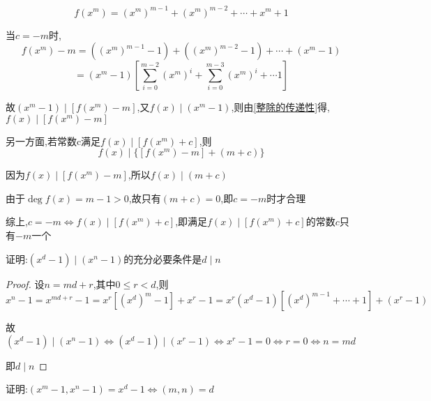 \begin{solution}
    \begin{equation*}
        f(x^m)=(x^m)^{m-1}+(x^m)^{m-2}+\cdots + x^m+1
    \end{equation*}

    当$c=-m$时,
    \begin{equation*}
        f(x^m)-m=((x^m)^{m-1}-1)+((x^m)^{m-2}-1)+\cdots + (x^m-1)
    \end{equation*}
    \begin{equation*}
        =(x^m-1)[\overset{m-2}{\underset{i=0}{\sum}}(x^m)^i+\overset{m-3}{\underset{i=0}{\sum}}(x^m)^i+\cdots
        1]
    \end{equation*}

    故$(x^m-1)\mid [f(x^m)-m]$,又$f(x)\mid (x^m-1)$,则由\cref{整除的传递性}得,$f(x)\mid [f(x^m)-m]$

    \vspace{4pt}
    另一方面,若常数c满足$f(x)\mid [f(x^m)+c]$,则
    \begin{equation*}
        f(x)\mid \{[f(x^m)-m]+(m+c)\}
    \end{equation*}

    因为$f(x)\mid [f(x^m)-m]$,所以$f(x)\mid (m+c)$

    由于$\deg f(x)=m-1>0$,故只有$(m+c)=0$,即$c=-m$时才合理

    \vspace{4pt}
    综上,$c=-m \Longleftrightarrow f(x)\mid {[f(x^m)+c]}$,即满足$f(x)\mid {[f(x^m)+c]}$的常数$c$只有$-m$一个
\end{solution}

\begin{example} \label{例题1.1.6}
    证明:$(x^d-1)\mid (x^n-1)$的充分必要条件是$d\mid n$
\end{example}

\begin{proof}

    设$n=md+r$,其中$0\le r <d$,则
    \begin{equation*}
        x^n-1=x^{md+r}-1=x^r[(x^d)^m-1]+x^r-1=x^r(x^d-1)[(x^d)^{m-1}+\cdots +1]+(x^r-1)
    \end{equation*}

    故$(x^d-1)\mid (x^n-1) \Longleftrightarrow (x^d-1)\mid (x^r-1)\Longleftrightarrow x^r-1=0\Longleftrightarrow r=0 \Longleftrightarrow n=md$

    即$d\mid n$
\end{proof}

\begin{example} \label{例题1.1.7}
    证明:$(x^m-1,x^n-1)=x^d-1\Longleftrightarrow (m,n)=d$
\end{example}

